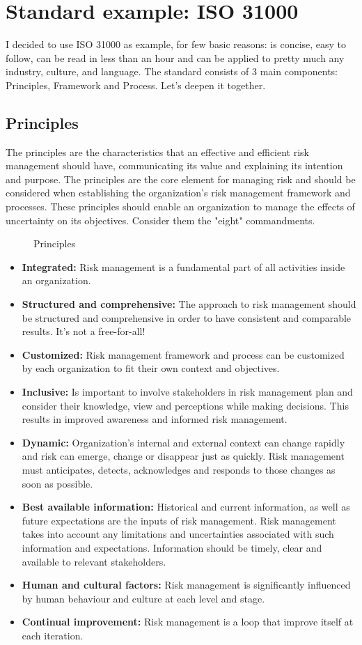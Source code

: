 \section{Standard example: ISO 31000}
I decided to use ISO 31000 \cite{ISO2018} as example, for few basic reasons: is concise, easy to follow, can be read in less than an hour and can be applied to pretty much any industry, culture, and language. The standard consists of 3 main components: Principles, Framework and Process. Let's deepen it together. 
\subsection{Principles}
The principles are the characteristics that an effective and efficient risk management should have, communicating its value and explaining its intention and purpose. The principles are the core element for managing risk and should be considered when establishing the organization’s risk management framework and processes. These principles should enable an organization to manage the effects of uncertainty on its objectives. Consider them the "eight" commandments.
\begin{figure}[H]
  \centering
  
  \caption{Principles}
\end{figure}
\noindent
\begin{itemize}
    \item \textbf{Integrated:} Risk management is a fundamental part of all activities inside an organization.
    \item \textbf{Structured and comprehensive:} The approach to risk management should be structured and comprehensive in order to have consistent and comparable results. It's not a free-for-all!
    \item \textbf{Customized:} Risk management framework and process can be customized by each organization to fit their own context and objectives. 
    \item \textbf{Inclusive:} Is important to involve stakeholders in risk management plan and consider their knowledge, view and perceptions while making decisions. This results in improved awareness and informed risk management.
    \item \textbf{Dynamic:} Organization's internal and external context can change rapidly and risk can emerge, change or disappear just as quickly. Risk management must anticipates, detects, acknowledges and responds to those changes as soon as possible.
    \item \textbf{Best available information:} Historical and current information, as well as future expectations are the inputs of risk management. Risk management takes into account any limitations and uncertainties associated with such information and expectations. Information should be timely, clear and available to relevant stakeholders.
    \item \textbf{Human and cultural factors:} Risk management is significantly influenced by human behaviour and culture at each level and stage.
    \item \textbf{Continual improvement:} Risk management is a loop that improve itself at each iteration.
\end{itemize}
